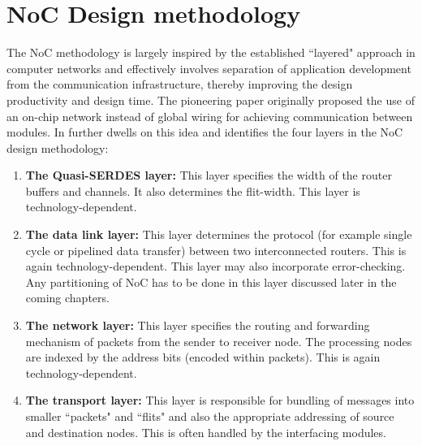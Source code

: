 \section {NoC Design methodology }
\hspace{5mm}The NoC methodology is largely inspired by the established ``layered" approach in computer networks and effectively involves separation of application development from the communication infrastructure, thereby improving the design productivity and design time. The pioneering paper \cite{twelve} originally proposed the use of an on-chip network instead of global wiring for achieving communication between modules. In \cite{935594} further dwells on this idea and identifies the four layers in the NoC design methodology:

\begin{enumerate} 
	\item{\textbf{The Quasi-SERDES layer:} This layer specifies the width of the router buffers and channels. It also determines the flit-width. This layer is technology-dependent.}
	\item{\textbf{The data link layer:} This layer determines the protocol (for example single cycle or pipelined data transfer) between two interconnected routers. This is again technology-dependent. This layer may also incorporate error-checking. Any partitioning of NoC has to be done in this layer discussed later in the coming chapters.}
	\item{\textbf{The network layer:} This layer specifies the routing and forwarding mechanism of packets from the sender to receiver node. The processing nodes are indexed by the address bits (encoded within packets). This is again technology-dependent.}
	\item{\textbf{The transport layer:} This layer is responsible for bundling of messages into smaller ``packets" and ``flits" and also the appropriate addressing of source and destination nodes. This is often handled by the interfacing modules\cite{6498567}.}
\end{enumerate}

